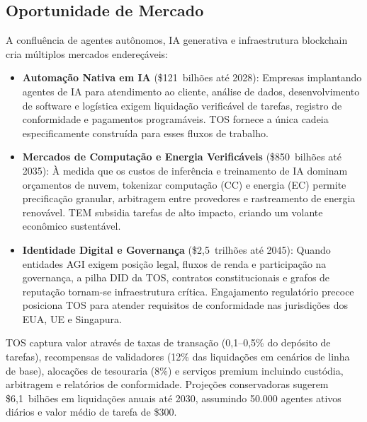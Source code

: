 \documentclass[11pt]{article}
\begin{document}
\subsection{Oportunidade de Mercado}
A confluência de agentes autônomos, IA generativa e infraestrutura blockchain cria múltiplos mercados endereçáveis:
\begin{itemize}[noitemsep]
  \item \textbf{Automação Nativa em IA} (\$121~bilhões até 2028): Empresas implantando agentes de IA para atendimento ao cliente, análise de dados, desenvolvimento de software e logística exigem liquidação verificável de tarefas, registro de conformidade e pagamentos programáveis. TOS fornece a única cadeia especificamente construída para esses fluxos de trabalho.
  \item \textbf{Mercados de Computação e Energia Verificáveis} (\$850~bilhões até 2035): À medida que os custos de inferência e treinamento de IA dominam orçamentos de nuvem, tokenizar computação (CC) e energia (EC) permite precificação granular, arbitragem entre provedores e rastreamento de energia renovável. TEM subsidia tarefas de alto impacto, criando um volante econômico sustentável.
  \item \textbf{Identidade Digital e Governança} (\$2,5~trilhões até 2045): Quando entidades AGI exigem posição legal, fluxos de renda e participação na governança, a pilha DID da TOS, contratos constitucionais e grafos de reputação tornam-se infraestrutura crítica. Engajamento regulatório precoce posiciona TOS para atender requisitos de conformidade nas jurisdições dos EUA, UE e Singapura.
\end{itemize}

TOS captura valor através de taxas de transação (0,1--0,5\% do depósito de tarefas), recompensas de validadores (12\% das liquidações em cenários de linha de base), alocações de tesouraria (8\%) e serviços premium incluindo custódia, arbitragem e relatórios de conformidade. Projeções conservadoras sugerem \$6,1~bilhões em liquidações anuais até 2030, assumindo 50.000 agentes ativos diários e valor médio de tarefa de \$300.
\end{document}

